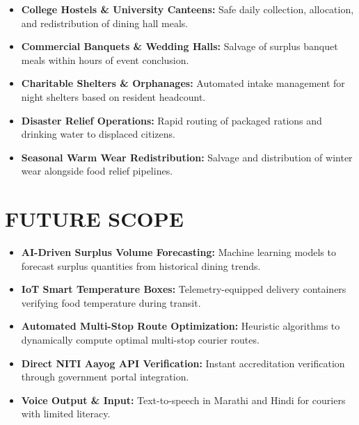 \documentclass[12pt,a4paper]{article}
\begin{document}
\begin{itemize}
    \item \textbf{College Hostels \& University Canteens:} Safe daily collection, allocation, and redistribution of dining hall meals.
    \item \textbf{Commercial Banquets \& Wedding Halls:} Salvage of surplus banquet meals within hours of event conclusion.
    \item \textbf{Charitable Shelters \& Orphanages:} Automated intake management for night shelters based on resident headcount.
    \item \textbf{Disaster Relief Operations:} Rapid routing of packaged rations and drinking water to displaced citizens.
    \item \textbf{Seasonal Warm Wear Redistribution:} Salvage and distribution of winter wear alongside food relief pipelines.
\end{itemize}

\newpage
\section{FUTURE SCOPE}

\begin{itemize}
    \item \textbf{AI-Driven Surplus Volume Forecasting:} Machine learning models to forecast surplus quantities from historical dining trends.
    \item \textbf{IoT Smart Temperature Boxes:} Telemetry-equipped delivery containers verifying food temperature during transit.
    \item \textbf{Automated Multi-Stop Route Optimization:} Heuristic algorithms to dynamically compute optimal multi-stop courier routes.
    \item \textbf{Direct NITI Aayog API Verification:} Instant accreditation verification through government portal integration.
    \item \textbf{Voice Output \& Input:} Text-to-speech in Marathi and Hindi for couriers with limited literacy.
\end{itemize}

\newpage
\end{document}
